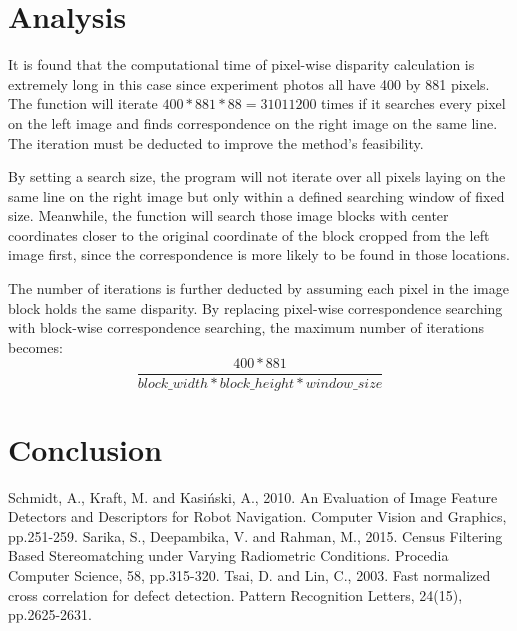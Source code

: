 \documentclass[conference]{IEEEtran}
\begin{document}
\section{Analysis}
It is found that the computational time of pixel-wise disparity calculation is extremely long in this case since experiment photos all have 400 by 881 pixels. The function will iterate $400*881*88=31011200$ times if it searches every pixel on the left image and finds correspondence on the right image on the same line. The iteration must be deducted to improve the method's feasibility.

By setting a search size, the program will not iterate over all pixels laying on the same line on the right image but only within a defined searching window of fixed size. Meanwhile, the function will search those image blocks with center coordinates closer to the original coordinate of the block cropped from the left image first, since the correspondence is more likely to be found in those locations.

The number of iterations is further deducted by assuming each pixel in the image block holds the same disparity. By replacing pixel-wise correspondence searching with block-wise correspondence searching, the maximum number of iterations becomes:
\begin{equation*}
    \frac{400*881}{block\_width*block\_height*window\_size}
\end{equation*}

\section{Conclusion}

\newpage
\begin{thebibliography}{00}
 Schmidt, A., Kraft, M. and Kasiński, A., 2010. An Evaluation of Image Feature Detectors and Descriptors for Robot Navigation. Computer Vision and Graphics, pp.251-259.
 Sarika, S., Deepambika, V. and Rahman, M., 2015. Census Filtering Based Stereomatching under Varying Radiometric Conditions. Procedia Computer Science, 58, pp.315-320.
 Tsai, D. and Lin, C., 2003. Fast normalized cross correlation for defect detection. Pattern Recognition Letters, 24(15), pp.2625-2631.
\end{thebibliography}
\vspace{12pt}
\end{document}
